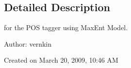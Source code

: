 \subsection{Detailed Description}
for the POS tagger using MaxEnt Model. 

\begin{Desc}
\item[Author:]vernkin\end{Desc}
Created on March 20, 2009, 10:46 AM 